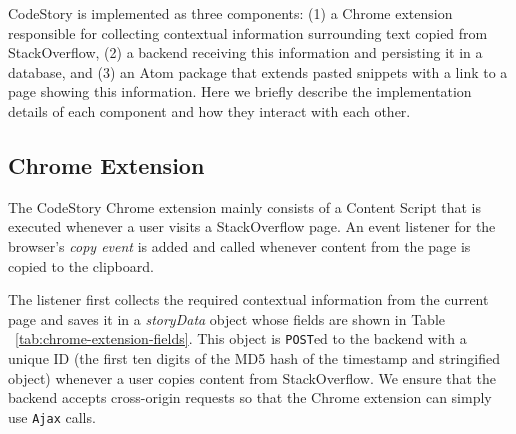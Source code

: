 \documentclass[../manifest.tex]{subfiles}
\begin{document}
CodeStory is implemented as three components: (1) a Chrome extension responsible for collecting contextual information surrounding text copied from StackOverflow, (2) a backend receiving this information and persisting it in a database, and (3) an Atom package that
extends pasted snippets with a link to a page showing this information. Here we briefly describe the implementation details of each component and how they interact with each other.

\subsection{Chrome Extension}
The CodeStory Chrome extension mainly consists of a Content Script that is executed whenever a user visits a StackOverflow page. An event listener for the browser's \textit{copy event} is added and called whenever content from the page is copied to the clipboard.

The listener first collects the required contextual information from the current page and saves it in a \textit{storyData} object whose fields are shown in Table ~\ref{tab:chrome-extension-fields}. This object is \texttt{POST}ed to the backend
with a unique ID (the first ten digits of the MD5 hash of the timestamp and stringified object) whenever a user copies content from StackOverflow. We ensure that the backend accepts cross-origin requests so that the Chrome extension can simply use \texttt{Ajax} calls.
\end{document}
